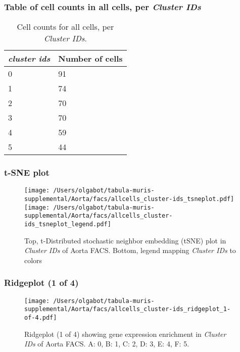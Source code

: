 \subsubsection{Table of cell counts in all cells, per \emph{Cluster IDs}}\begin{table}[h]
\centering
\label{my-label}
\begin{tabular}{@{}ll@{}}
\toprule

\emph{cluster ids}& Number of cells \\ \midrule
0 & 91 \\

1 & 74 \\

2 & 70 \\

3 & 70 \\

4 & 59 \\

5 & 44 \\
\bottomrule
\end{tabular}
\caption{Cell counts for all cells, per \emph{Cluster IDs}.}
\end{table}

\clearpage
\subsubsection{t-SNE plot}
\begin{figure}[h]
\centering
\texttt{[image: /Users/olgabot/tabula-muris-supplemental/Aorta/facs/allcells\_cluster-ids\_tsneplot.pdf]}
\texttt{[image: /Users/olgabot/tabula-muris-supplemental/Aorta/facs/allcells\_cluster-ids\_tsneplot\_legend.pdf]}
\caption{Top, t-Distributed stochastic neighbor embedding (tSNE) plot  in \emph{Cluster IDs} of Aorta FACS. Bottom, legend mapping \emph{Cluster IDs} to colors}
\end{figure}


\clearpage
\subsubsection{Ridgeplot (1 of 4)}
\begin{figure}[h]
\centering
\texttt{[image: /Users/olgabot/tabula-muris-supplemental/Aorta/facs/allcells\_cluster-ids\_ridgeplot\_1-of-4.pdf]}

\caption{ Ridgeplot (1 of 4)  showing gene expression enrichment in \emph{Cluster IDs} of Aorta FACS. A: 0, B: 1, C: 2, D: 3, E: 4, F: 5.}
\end{figure}


